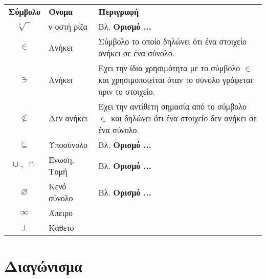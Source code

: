 \documentclass[twoside,11pt,a4paper]{book}
\begin{document}
\newpage
\noindent
{\par\centering
\begin{tabularx}{\textwidth}{c|>{\centering}m{3.1cm}|>{\centering\arraybackslash}m{7.75cm}}
\hline\rule[-2ex]{0pt}{5.5ex}\textbf{Σύμβολο} & \textbf{Όνομα} & \textbf{Περιγραφή}\\
\hhline{===}\rule[-2ex]{0pt}{8.5ex}
$ \sqrt[\nu]{\;\;} $ & ν-οστή ρίζα & Βλ. \textbf{Ορισμό ...} \\
$ \in $ & Ανήκει & Σύμβολο το οποίο δηλώνει ότι ένα στοιχείο ανήκει σε ένα σύνολο. \\
\rule[-2ex]{0pt}{7.5ex}
$ \ni $ & Ανήκει & Έχει την ίδια χρησιμότητα με το σύμβολο $ \in $ και χρησιμοποιείται όταν το σύνολο γράφεται πριν το στοιχείο. \\
\rule[-2ex]{0pt}{7.5ex}
$ \notin $ & Δεν ανήκει & Έχει την αντίθετη σημασία από το σύμβολο $ \in $ και δηλώνει ότι ένα στοιχείο δεν ανήκει σε ένα σύνολο. \\
\rule[-2ex]{0pt}{5.5ex}
$ \subseteq $ & Υποσύνολο & Βλ. \textbf{Ορισμό ...} \\
\rule[-2ex]{0pt}{5.5ex}
$ \cup\;,\;\cap $ & Ένωση, Τομή & Βλ. \textbf{Ορισμό ...} \\
\rule[-2ex]{0pt}{5.5ex}
$ \varnothing $ & Κενό σύνολο & Βλ. \textbf{Ορισμό ...} \\
\rule[-2ex]{0pt}{5.5ex}
$ \infty $ & Άπειρο & \\
\rule[-2ex]{0pt}{5.5ex}
$ \bot $ & Κάθετο & \\
\hline
\end{tabularx}
\par}
\mainmatter

%
%

\part{Διαγώνισμα}
\pagestyle{fancy}

\end{document}
